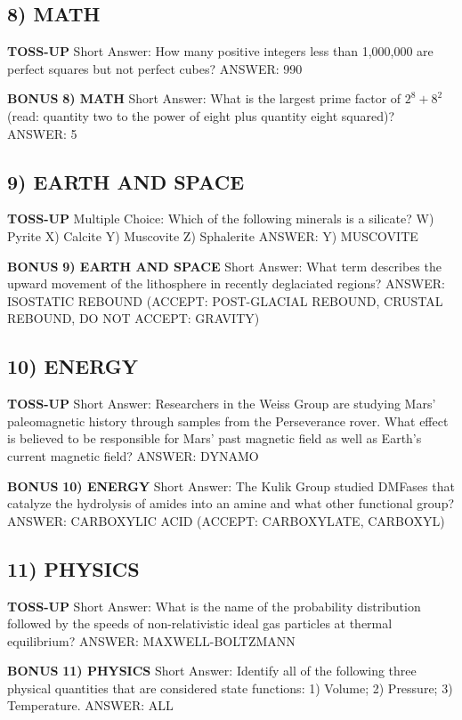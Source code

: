 \documentclass{article}
\begin{document}
\subsection*{8) MATH}
\textbf{TOSS-UP}
Short Answer: How many positive integers less than 1,000,000 are perfect squares but not perfect cubes?
ANSWER: 990

\textbf{BONUS}
\textbf{8) MATH}
Short Answer: What is the largest prime factor of $2^{8}+8^{2}$ (read: quantity two to the power of eight plus quantity eight squared)?
ANSWER: 5

\subsection*{9) EARTH AND SPACE}
\textbf{TOSS-UP}
Multiple Choice: Which of the following minerals is a silicate?
W) Pyrite
X) Calcite
Y) Muscovite
Z) Sphalerite
ANSWER: Y) MUSCOVITE

\textbf{BONUS}
\textbf{9) EARTH AND SPACE}
Short Answer: What term describes the upward movement of the lithosphere in recently deglaciated regions?
ANSWER: ISOSTATIC REBOUND (ACCEPT: POST-GLACIAL REBOUND, CRUSTAL REBOUND, DO NOT ACCEPT: GRAVITY)

\subsection*{10) ENERGY}
\textbf{TOSS-UP}
Short Answer: Researchers in the Weiss Group are studying Mars' paleomagnetic history through samples from the Perseverance rover. What effect is believed to be responsible for Mars' past magnetic field as well as Earth's current magnetic field?
ANSWER: DYNAMO

\textbf{BONUS}
\textbf{10) ENERGY}
Short Answer: The Kulik Group studied DMFases that catalyze the hydrolysis of amides into an amine and what other functional group?
ANSWER: CARBOXYLIC ACID (ACCEPT: CARBOXYLATE, CARBOXYL)

\subsection*{11) PHYSICS}
\textbf{TOSS-UP}
Short Answer: What is the name of the probability distribution followed by the speeds of non-relativistic ideal gas particles at thermal equilibrium?
ANSWER: MAXWELL-BOLTZMANN

\textbf{BONUS}
\textbf{11) PHYSICS}
Short Answer: Identify all of the following three physical quantities that are considered state functions: 1) Volume; 2) Pressure; 3) Temperature.
ANSWER: ALL
\end{document}
